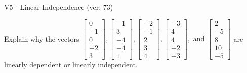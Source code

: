 \begin{exercise}
  \begin{exerciseTitle}V5 - Linear Independence (ver. 73)\end{exerciseTitle}
  \begin{exerciseStatement}
    Explain why the vectors \(\left[\begin{array}{r}
0 \\
-1 \\
0 \\
-2 \\
3
\end{array}\right] , \left[\begin{array}{r}
-1 \\
3 \\
-4 \\
-4 \\
1
\end{array}\right] , \left[\begin{array}{r}
-2 \\
-1 \\
2 \\
3 \\
4
\end{array}\right] , \left[\begin{array}{r}
-3 \\
4 \\
4 \\
-2 \\
-3
\end{array}\right] , \text{ and } \left[\begin{array}{r}
2 \\
-5 \\
8 \\
10 \\
-5
\end{array}\right]\) are linearly dependent or linearly independent.	



\end{exerciseStatement}
\end{exercise}
